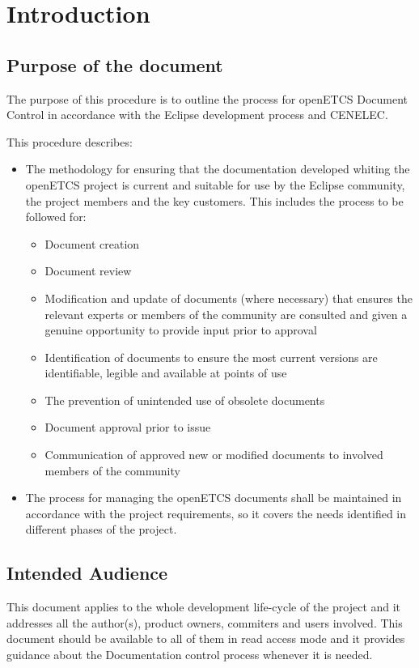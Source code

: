 \documentclass{template/openetcs_article}
\begin{document}
\newpage

\section{Introduction}

\subsection[Introduction]{Purpose of the document}
The purpose of this procedure is to outline the process for openETCS Document Control in accordance with the Eclipse development process and CENELEC. 

This procedure describes:
\begin{itemize}
\item The methodology for ensuring that the documentation developed whiting the openETCS project is current and suitable for use by the Eclipse community, the project members and the key customers. This includes the process to be followed for:
\begin{itemize}
\item Document creation
\item Document review
\item Modification and update of documents (where necessary) that ensures the relevant experts or members of the community are consulted and given a genuine opportunity to provide input prior to approval
\item Identification of documents to ensure the most current versions are identifiable, legible and available at points of use
\item The prevention of unintended use of obsolete documents
\item Document approval prior to issue
\item Communication of approved new or modified documents to involved members of the community
\end{itemize}
\item The process for managing the openETCS documents shall be maintained in accordance with the project requirements, so it covers the needs identified in different phases of the project.
\end{itemize}

\subsection{Intended Audience}
This document applies to the whole development life-cycle of the project and it addresses all the author(s), product owners, commiters and users involved. This document should be available to all of them in read access mode and it provides guidance about the Documentation control process whenever it is needed. 
\end{document}
